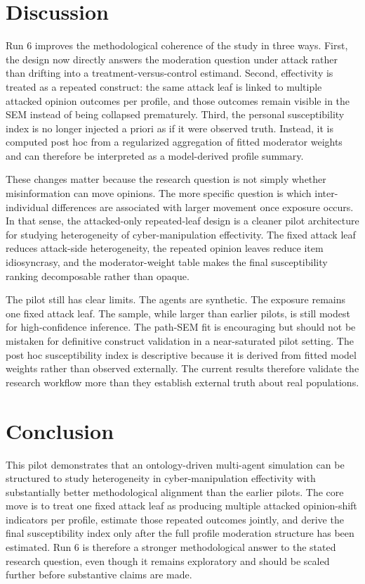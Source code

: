\documentclass[11pt]{article}
\begin{document}
\section{Discussion}
Run 6 improves the methodological coherence of the study in three ways. First, the design now directly answers the moderation question under attack rather than drifting into a treatment-versus-control estimand. Second, effectivity is treated as a repeated construct: the same attack leaf is linked to multiple attacked opinion outcomes per profile, and those outcomes remain visible in the SEM instead of being collapsed prematurely. Third, the personal susceptibility index is no longer injected a priori as if it were observed truth. Instead, it is computed post hoc from a regularized aggregation of fitted moderator weights and can therefore be interpreted as a model-derived profile summary.

These changes matter because the research question is not simply whether misinformation can move opinions. The more specific question is which inter-individual differences are associated with larger movement once exposure occurs. In that sense, the attacked-only repeated-leaf design is a cleaner pilot architecture for studying heterogeneity of cyber-manipulation effectivity. The fixed attack leaf reduces attack-side heterogeneity, the repeated opinion leaves reduce item idiosyncrasy, and the moderator-weight table makes the final susceptibility ranking decomposable rather than opaque.

The pilot still has clear limits. The agents are synthetic. The exposure remains one fixed attack leaf. The sample, while larger than earlier pilots, is still modest for high-confidence inference. The path-SEM fit is encouraging but should not be mistaken for definitive construct validation in a near-saturated pilot setting. The post hoc susceptibility index is descriptive because it is derived from fitted model weights rather than observed externally. The current results therefore validate the research workflow more than they establish external truth about real populations.

\section{Conclusion}
This pilot demonstrates that an ontology-driven multi-agent simulation can be structured to study heterogeneity in cyber-manipulation effectivity with substantially better methodological alignment than the earlier pilots. The core move is to treat one fixed attack leaf as producing multiple attacked opinion-shift indicators per profile, estimate those repeated outcomes jointly, and derive the final susceptibility index only after the full profile moderation structure has been estimated. Run 6 is therefore a stronger methodological answer to the stated research question, even though it remains exploratory and should be scaled further before substantive claims are made.
\end{document}
